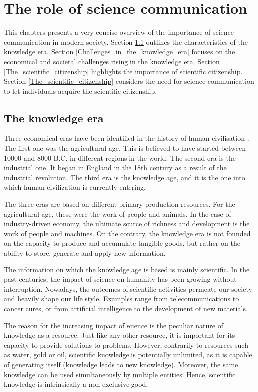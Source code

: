 \chapter{The role of science communication}
This chapters presents a very concise overview of the importance of science communication in modern society. Section \ref{The_knowledge_era} outlines the characteristics of the knowledge era. Section \ref{Challenges_in_the_knowledge_era} focuses on the economical and societal challenges rising in the knowledge era. Section \ref{The_scientific_citizenship} highlights the importance of scientific citizenship. Section \ref{The_scientific_citizenship} considers the need for science communication to let individuals acquire the scientific citizenship. 

\section{The knowledge era} \label{The_knowledge_era}
Three economical eras have been identified in the history of human civilisation \cite{Aasi1}. The first one was the agricultural age. This is believed to have started between 10000 and 8000 B.C. in different regions in the world. The second era is the industrial one. It began in England in the 18th century as a result of the industrial revolution. The third era is the knowledge age, and it is the one into which human civilization is currently entering. 

The three eras are based on different primary production resources. For the agricultural age, these were the work of people and animals. In the case of industry-driven economy, the ultimate source of richness and development is the work of people and machines. On the contrary, the knowledge era is not founded on the capacity to produce and accumulate tangible goods, but rather on the ability to store, generate and apply new information.

The information on which the knowledge age is based is mainly scientific. In the past centuries, the impact of science on humanity has been growing without interruption. Nowadays, the outcomes of scientific activities permeate our society and heavily shape our life style. Examples range from telecommunications to cancer cures, or from artificial intelligence to the development of new materials.

The reason for the increasing impact of science is the peculiar nature of knowledge as a resource. Just like any other resource, it is important for its capacity to provide solutions to problems. However, contrarily to resources such as water, gold or oil, scientific knowledge is potentially unlimited, as it is capable of generating itself (knowledge leads to new knowledge). Moreover, the same knowledge can be used simultaneously by multiple entities. Hence, scientific knowledge is intrinsically a non-exclusive good.


